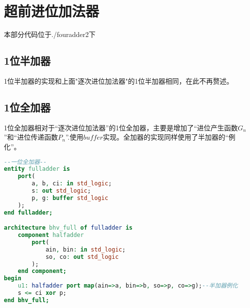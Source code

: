 \documentclass[UTF8, onecolumn, a4paper]{article}
\begin{document}
\section{超前进位加法器}
本部分代码位于./fouradder2下
\subsection{1位半加器}
1位半加器的实现和上面"逐次进位加法器"的1位半加器相同，在此不再赘述。
\subsection{1位全加器}
1位全加器相对于“逐次进位加法器”的1位全加器，主要是增加了“进位产生函数$G_n$”和“进位传递函数$P_n$”.使用$buffer$实现。全加器的实现同样使用了半加器的“例化”。
\begin{lstlisting}[language={VHDL}, title={fulladder.vhd}]
--一位全加器--
entity fulladder is
	port(
		a, b, ci: in std_logic;
		s: out std_logic;
		p, g: buffer std_logic
	);
end fulladder;

architecture bhv_full of fulladder is
	component halfadder
		port(
			ain, bin: in std_logic;
			so, co: out std_logic
		);
	end component;
begin
	u1: halfadder port map(ain=>a, bin=>b, so=>p, co=>g);--半加器例化
	s <= ci xor p;
end bhv_full;
\end{lstlisting}
\end{document}
